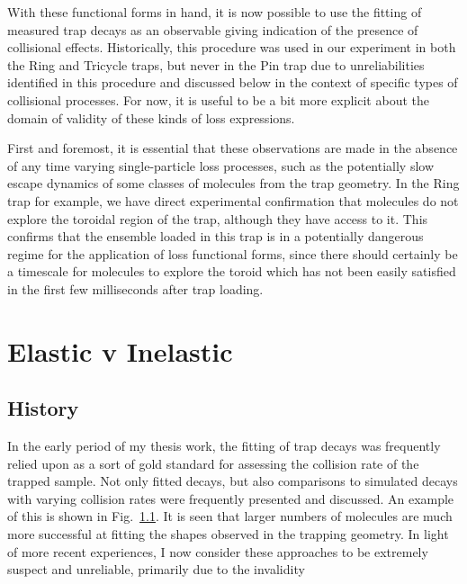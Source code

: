 With these functional forms in hand, it is now possible to use the fitting of measured trap decays as an observable giving indication of the presence of collisional effects.
Historically, this procedure was used in our experiment in both the Ring and Tricycle traps, but never in the Pin trap due to unreliabilities identified in this procedure and discussed below in the context of specific types of collisional processes.
For now, it is useful to be a bit more explicit about the domain of validity of these kinds of loss expressions.

First and foremost, it is essential that these observations are made in the absence of any time varying single-particle loss processes, such as the potentially slow escape dynamics of some classes of molecules from the trap geometry.
In the Ring trap for example, we have direct experimental confirmation that molecules do not explore the toroidal region of the trap, although they have access to it.
This confirms that the ensemble loaded in this trap is in a potentially dangerous regime for the application of loss functional forms, since there should certainly be a timescale for molecules to explore the toroid which has not been easily satisfied in the first few milliseconds after trap loading.

\section{Elastic v Inelastic}

\subsection{History}

In the early period of my thesis work, the fitting of trap decays was frequently relied upon as a sort of gold standard for assessing the collision rate of the trapped sample.
Not only fitted decays, but also comparisons to simulated decays with varying collision rates were frequently presented and discussed.
An example of this is shown in Fig.~\ref{}.
It is seen that larger numbers of molecules are much more successful at fitting the shapes observed in the trapping geometry.
In light of more recent experiences, I now consider these approaches to be extremely suspect and unreliable, primarily due to the invalidity 











\ifx\justbeingincluded\undefined

\fi